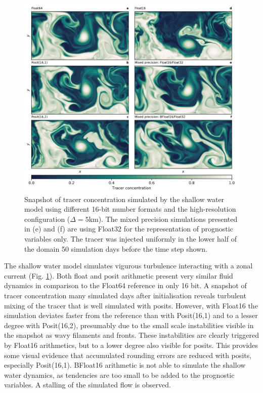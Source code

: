 \documentclass[draft]{agujournal2019}
\begin{document}
\begin{figure}
\includegraphics[width=1\textwidth]{snapshot.png}
\caption{Snapshot of tracer concentration simulated by the shallow water model
using different 16-bit number formats and the high-resolution configuration
($\Delta = 5$km). The mixed precision simulations presented in (e) and (f) are
using Float32 for the representation of prognostic variables only. The tracer
was injected uniformly in the lower half of the domain 50 simulation days before
the time step shown.}
\label{fig:snapshot}
\end{figure}

The shallow water model simulates vigurous turbulence interacting with a
zonal current (Fig. \ref{fig:snapshot}). Both float and posit arithmetic
present very similar fluid dynamics in comparison to the Float64 reference in
only 16 bit. A snapshot of tracer concentration many simulated days after
initialisation reveals turbulent mixing of the tracer that is well simulated
with posits. However, with Float16 the simulation deviates faster from the
reference than with Posit(16,1) and to a lesser degree with Posit(16,2),
presumably due to the small scale instabilities visible in the snapshot as
wavy filaments and fronts. These instabilities are clearly triggered by Float16
arithmetics, but to a lower degree also visible for posits. This provides some
visual evidence that accumulated rounding errors are reduced with posits, especially
Posit(16,1). BFloat16 arithmetic is not able to simulate the shallow water dynamics,
as tendencies are too small to be added to the prognostic variables. A stalling
of the simulated flow is observed.
\end{document}
